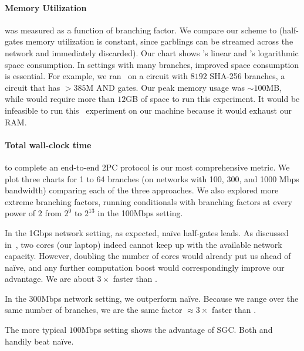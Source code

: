 \paragraph{Memory Utilization} was measured as a function of branching
factor.
We compare our scheme to \stack (half-gates memory utilization is
constant, since garblings
can be streamed across the network and immediately discarded).
%
Our chart shows \stack's linear and
\ourschemelong's logarithmic space consumption.
In settings with many branches, improved space consumption
is essential.
For example, we ran \ourschemelong\ on a circuit
with $8192$ SHA-256 branches, a circuit that has $> 385$M
AND gates.  Our peak memory usage was $\sim 100$MB, while \HK
would require more than $12$GB of space to run this experiment.
It would be
infeasible to run this \stack\ experiment on our machine because it
would exhaust our RAM.

\vspace{-8pt}
\paragraph{Total wall-clock time} to complete an end-to-end 2PC
protocol is our most comprehensive metric.
We plot three charts for 1 to 64
branches (on networks with 100, 300, and 1000 Mbps bandwidth) comparing each of the three approaches.
We also explored more extreme branching factors, running conditionals with
branching factors at every power of $2$ from $2^0$ to $2^{13}$ in the 100Mbps setting.

In the 1Gbps network setting, as expected, na\"ive half-gates leads.
As discussed in~, two cores (our laptop) indeed
cannot keep up with the available network capacity.  However, doubling
the number of cores would already put us ahead of na\"ive, and any
further computation boost would correspondingly improve
our advantage.  We are about $3\times$ faster than \stack.

In the 300Mbps network setting, we outperform na\"ive.  Because we
range over the same number of branches, we are the same
factor $\approx 3\times$ faster than \stack.

The more typical $100$Mbps setting shows the advantage of SGC.
Both \stack and \ourschemelong handily beat na\"ive.

